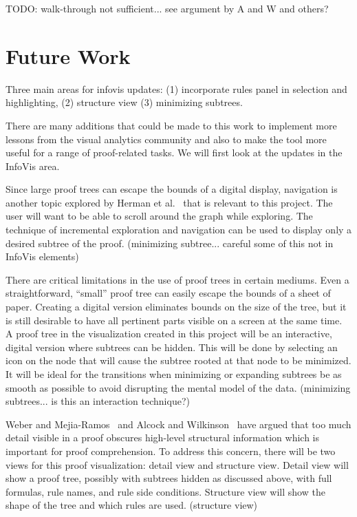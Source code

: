 \documentclass[conference]{IEEEtran}
\begin{document}
TODO: walk-through not sufficient... see argument by A and W and others?


\section{Future Work}
\label{sec:future}

Three main areas for infovis updates: (1) incorporate rules panel in selection and highlighting, (2) structure view (3) minimizing subtrees.

There are many additions that could be made to this work to implement more lessons from the visual analytics community and also to make the tool more useful for a range of proof-related tasks. We will first look at the updates in the InfoVis area.

Since large proof trees can escape the bounds of a digital display, navigation is another topic explored by Herman et al.~\cite{graphvis-herman+melancon+marshall} that is relevant to this project. The user will want to be able to scroll around the graph while exploring. The technique of incremental exploration and navigation can be used to display only a desired subtree of the proof. (minimizing subtree... careful some of this not in InfoVis elements)

There are critical limitations in the use of proof trees in certain mediums. Even a straightforward, ``small'' proof tree can easily escape the bounds of a sheet of paper. Creating a digital version eliminates bounds on the size of the tree, but it is still desirable to have all pertinent parts visible on a screen at the same time. A proof tree in the visualization created in this project will be an interactive, digital version where subtrees can be hidden. This will be done by selecting an icon on the node that will cause the subtree rooted at that node to be minimized. It will be ideal for the transitions when minimizing or expanding subtrees be as smooth as possible to avoid disrupting the mental model of the data. (minimizing subtrees... is this an interaction technique?)



Weber and Mejia-Ramos~\cite{majorsbeliefs-weber+mejiaramos} and Alcock and Wilkinson~\cite{eproofs-alcock+wilkinson} have argued that too much detail visible in a proof obscures high-level structural information which is important for proof comprehension. To address this concern, there will be two views for this proof visualization: detail view and structure view. Detail view will show a proof tree, possibly with subtrees hidden as discussed above, with full formulas, rule names, and rule side conditions. Structure view will show the shape of the tree and which rules are used. (structure view)
\end{document}
